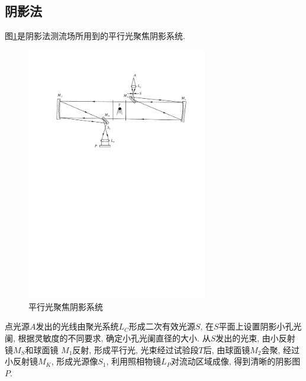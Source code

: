 \documentclass[12pt,a4paper,boxed,titlepage]{caspset}
\begin{document}
\subsection{阴影法}
 图\ref{shadow}是阴影法测流场所用到的平行光聚焦阴影系统.
\begin{figure}[!htb]
\centering
\includegraphics[width=0.7\textwidth]{shadow.pdf}
\caption{\label{shadow}平行光聚焦阴影系统}
\end{figure}
点光源$A$发出的光线由聚光系统$L_C$形成二次有效光源$S$, 在$S$平面上设置阴影小孔光阑, 根据灵敏度的不同要求, 确定小孔光阑直径的大小. 从$S$发出的光束, 由小反射镜$M_S$和球面镜 $M_1$反射, 形成平行光, 光束经过试验段$T$后, 由球面镜$M_2$会聚, 经过小反射镜$M_K$, 形成光源像$S_1$, 利用照相物镜$L_P$对流动区域成像, 得到清晰的阴影图$P$.
\end{document}
